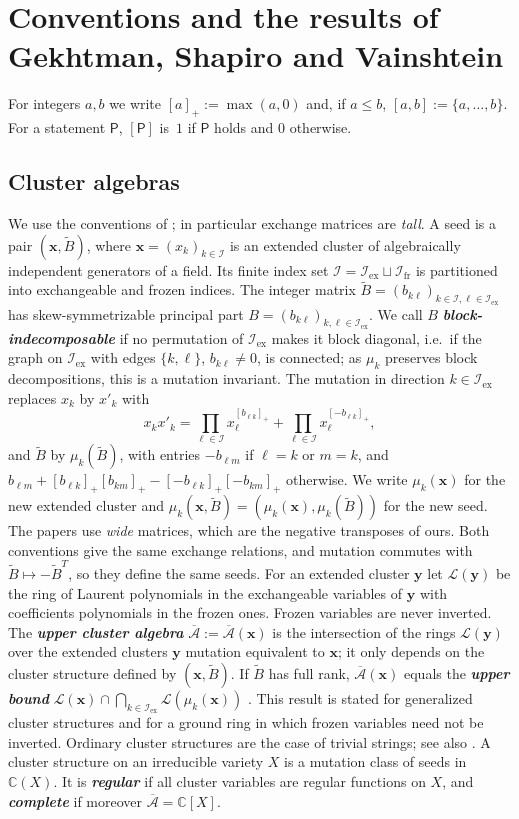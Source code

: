 \documentclass[a4paper]{amsart}
\numberwithin{equation}{section}
\theoremstyle{definition}
\theoremstyle{remark}
\newcommand{\bbC}{\mathbb{C}}
\newcommand{\mcL}{\mathcal{L}}
\newcommand{\mcI}{\mathcal{I}}
\newcommand{\oA}{\overline{\mathcal{A}}}
\newcommand{\bx}{\mathbf{x}}
\newcommand{\by}{\mathbf{y}}
\newcommand{\tB}{\widetilde{B}}
\newcommand{\ex}{\mathrm{ex}}
\newcommand{\fr}{\mathrm{fr}}
\newcommand{\newword}[1]{\textbf{\emph{#1}}}
\begin{document}
\section{Conventions and the results of Gekhtman, Shapiro and Vainshtein}
\label{sec: conventions}
For integers $a,b$ we write $[a]_+:=\max(a,0)$ and, if $a\le b$, $[a,b]:=\{a,\dots,b\}$.
For a statement $\mathsf P$, $[\mathsf P]$ is~$1$ if $\mathsf P$ holds and $0$ otherwise.

\subsection{Cluster algebras}
\label{sec: cluster conventions}
We use the conventions of \cite{BFZ05}; in particular exchange matrices are \emph{tall}.
A seed is a pair $(\bx,\tB)$, where $\bx=(x_k)_{k\in\mcI}$ is an extended cluster of algebraically independent generators of a field.
Its finite index set $\mcI=\mcI_\ex\sqcup\mcI_\fr$ is partitioned into exchangeable and frozen indices.
The integer matrix $\tB=(b_{k\ell})_{k\in\mcI,\ell\in\mcI_\ex}$ has skew-symmetrizable principal part $B=(b_{k\ell})_{k,\ell\in\mcI_\ex}$.
We call $B$ \newword{block-indecomposable} if no permutation of $\mcI_\ex$ makes it block diagonal, i.e.\ if the graph on $\mcI_\ex$ with edges $\{k,\ell\}$, $b_{k\ell}\neq0$, is connected; as $\mu_k$ preserves block decompositions, this is a mutation invariant.
The mutation in direction $k\in\mcI_\ex$ replaces $x_k$ by $x'_k$ with
\begin{equation}
  \label{eq: exchange}
  x_kx'_k=\prod_{\ell\in\mcI}x_\ell^{[b_{\ell k}]_+}+\prod_{\ell\in\mcI}x_\ell^{[-b_{\ell k}]_+},
\end{equation}
and $\tB$ by $\mu_k(\tB)$, with entries $-b_{\ell m}$ if $\ell=k$ or $m=k$, and $b_{\ell m}+[b_{\ell k}]_+[b_{km}]_+-[-b_{\ell k}]_+[-b_{km}]_+$ otherwise.
We write $\mu_k(\bx)$ for the new extended cluster and $\mu_k(\bx,\tB)=(\mu_k(\bx),\mu_k(\tB))$ for the new seed.
The papers \cite{GSV10,GSV19,GSV23} use \emph{wide} matrices, which are the negative transposes of ours.
Both conventions give the same exchange relations, and mutation commutes with $\tB\mapsto-\tB^T$, so they define the same seeds.
For an extended cluster $\by$ let $\mcL(\by)$ be the ring of Laurent polynomials in the exchangeable variables of $\by$ with coefficients polynomials in the frozen ones.
Frozen variables are never inverted.
The \newword{upper cluster algebra} $\oA:=\oA(\bx)$ is the intersection of the rings $\mcL(\by)$ over the extended clusters $\by$ mutation equivalent to $\bx$; it only depends on the cluster structure defined by $(\bx,\tB)$.
If $\tB$ has full rank, $\oA(\bx)$ equals the \newword{upper bound} $\mcL(\bx)\cap\bigcap_{k\in\mcI_\ex}\mcL(\mu_k(\bx))$ \cite[Theorem~3.11]{GSV18dd}.
This result is stated for generalized cluster structures and for a ground ring in which frozen variables need not be inverted.
Ordinary cluster structures are the case of trivial strings; see also \cite[Theorem~3.21 and Section~3.4]{GSV10}.
A cluster structure on an irreducible variety $X$ is a mutation class of seeds in $\bbC(X)$.
It is \newword{regular} if all cluster variables are regular functions on $X$, and \newword{complete} if moreover $\oA=\bbC[X]$.
\end{document}
